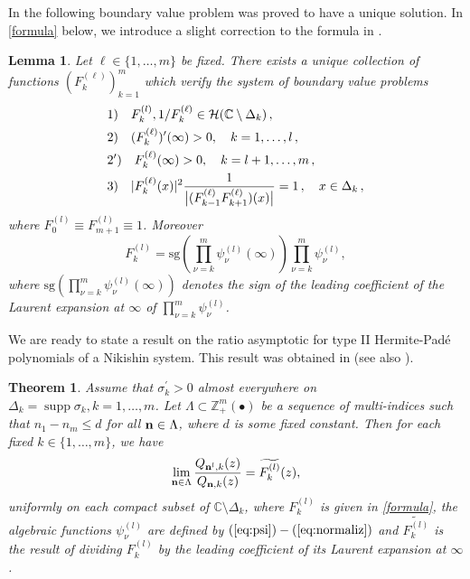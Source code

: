\documentclass{amsart}
\newtheorem{teo}{\sc Theorem}[section]
\newtheorem{lemma}{\sc Lemma}[section]
\theoremstyle{definition}
\theoremstyle{remark}
\newcommand{\supp}{\operatorname{supp }}
\begin{document}
In \cite[Lemma 4.2]{AptLopRoc} the following boundary value problem was proved to have a unique solution. In \eqref{formula} below, we introduce a slight correction  to the formula in  \cite{AptLopRoc}.

\begin{lemma}                \label{lm:system}
Let $\ell \in \{1,\ldots,m\}$ be fixed. There exists a unique collection of functions $(F_k^{(\ell)})_{k=1}^m$ which verify the system of boundary value problems
\begin{equation}          \label{eq:syst}
 \aligned &1 )\quad
F_k^{(l)},1/F_k^{(\ell)} \in \mathcal{H}(\mathbb{C} \setminus \Delta_k)\,,
\\
&2 )\quad (F _k^{(\ell)})'(\infty) > 0, \quad k=1,\dots,l\,,
\\
&2')\quad  F_k^{(\ell)}(\infty) > 0,  \quad k=l+1,\dots,m\,,
\\
&3 )\quad |F_k^{(\ell)}(x)|^2
\frac1{\bigl|(F_{k-1}^{(\ell)}F_{k+1}^{(\ell)})(x)\bigr|}= 1
 \,, \quad x \in \Delta_k\,,
\endaligned
\end{equation}
where ${F_0^{(l)}} \equiv {F_{m+1}^{(l)}} \equiv 1$. Moreover
\begin{equation} \label{formula}
F_k^{(l)} = \mbox{sg}\left(\prod_{\nu=k}^m \psi_{\nu}^{(l)}(\infty)\right)  \prod_{\nu=k}^m \psi_{\nu}^{(l)},
\end{equation}
where $\mbox{sg}\left(\prod_{\nu=k}^m \psi_{\nu}^{(l)}(\infty)\right)$ denotes the sign of the leading coefficient of the Laurent expansion at $\infty$ of
$\prod_{\nu=k}^m \psi_{\nu}^{(l)}$.
\end{lemma}

We are ready to state a result on the ratio asymptotic for type II Hermite-Pad\'e polynomials of a Nikishin system. This result was obtained in \cite{AptLopRoc} (see also \cite{LL}).

\begin{teo} \label{teo2}
Assume that $\sigma_k^{\prime} > 0$ almost everywhere on
$\Delta_k = \supp{\sigma_k}, k=1,\ldots,m$. Let $\Lambda \subset
{\mathbb{Z}}_+^m(\bullet)$ be a sequence of multi-indices such
that  $n_{1} - n_{m} \leq  d$ for all ${\bf n} \in \Lambda$, where $d$ is some fixed constant.  Then for each fixed $k \in \{1,\ldots,m\}$, we
have
\begin{equation} \label{eq:xe} \lim_{{\bf n}\in
{\Lambda}}\frac{Q_{{\bf n}^{l},k}(z)}{Q_{{\bf n},k}(z)}=
\widetilde{F_k^{(l)}}(z),
\end{equation}
uniformly on each compact subset of ${\mathbb{C}}
\setminus \Delta_k $, where $F_k^{(l)}$ is given in \eqref{formula}, the algebraic functions $\psi_{\nu}^{(l)}$ are defined by
$(\ref{eq:psi})-(\ref{eq:normaliz})$ and $\widetilde{F_k^{(l)}}$ is the result of dividing ${F_k^{(l)}}$ by the leading coefficient of its Laurent expansion at $\infty$.
\end{teo}
\end{document}
